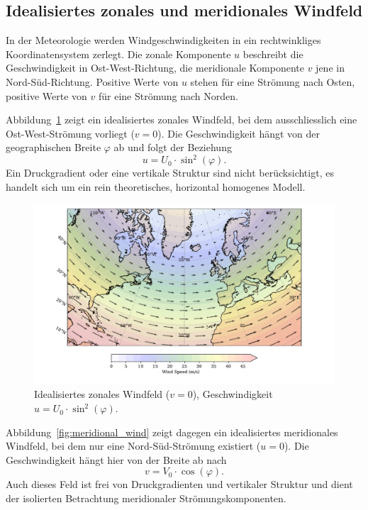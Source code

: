 
\subsection{Idealisiertes zonales und meridionales Windfeld}

In der Meteorologie werden Windgeschwindigkeiten in ein rechtwinkliges
Koordinatensystem zerlegt. Die {zonal}e Komponente \(u\) beschreibt die
Geschwindigkeit in Ost-West-Richtung, die {meridional}e Komponente \(v\) jene
in Nord-Süd-Richtung. Positive Werte von \(u\) stehen für eine Strömung nach
Osten, positive Werte von \(v\) für eine Strömung nach Norden.

Abbildung~\ref{fig:zonal_wind} zeigt ein idealisiertes zonales Windfeld, bei
dem ausschliesslich eine Ost-West-Strömung vorliegt (\(v = 0\)). Die
Geschwindigkeit hängt von der geographischen Breite \(\varphi\) ab und folgt
der Beziehung
\begin{equation}
	u = U_0 \cdot \sin^2(\varphi).
	\label{rossby:eq:zonal_wind}
\end{equation}
Ein Druckgradient oder eine vertikale Struktur sind nicht berücksichtigt, es handelt sich um ein rein theoretisches, horizontal homogenes Modell.

\begin{figure}
	\centering
	\includegraphics[width=\textwidth, trim=1cm 0cm 2cm 0cm, clip]{papers/rossby/images/zonal_wind_plot.pdf}
	\caption{Idealisiertes zonales Windfeld (\(v=0\)), Geschwindigkeit \(u = U_0 \cdot \sin^2(\varphi)\).}
	\label{fig:zonal_wind}
\end{figure}

\noindent
Abbildung~\ref{fig:meridional_wind} zeigt dagegen ein idealisiertes meridionales Windfeld, bei dem nur eine Nord-Süd-Strömung existiert (\(u = 0\)).
Die Geschwindigkeit hängt hier von der Breite ab nach
\begin{equation}
	v = V_0 \cdot \cos(\varphi).
	\label{rossby:eq:meridional_wind}
\end{equation}
Auch dieses Feld ist frei von Druckgradienten und vertikaler Struktur und dient der isolierten Betrachtung meridionaler Strömungskomponenten.


